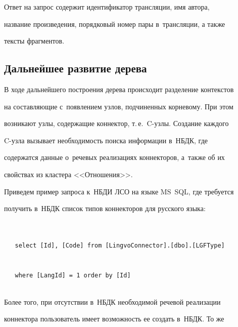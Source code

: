    


  


  Ответ на запрос содержит идентификатор трансляции, имя автора, 


название произведения, порядковый номер пары в~трансляции, а также 


тексты фрагментов.


  


  \subsection{Дальнейшее развитие дерева}


  


  В ходе дальнейшего построения дерева происходит разделение контекстов 


на составляющие с~появлением узлов, подчиненных корневому. При этом 


возникают узлы, содержащие коннектор, т.\,е.\ C-уз\-лы. Создание каж\-до\-го  


C-уз\-ла вызывает необходимость поиска информации в~НБДК, где 


содержатся данные о~речевых реализациях коннекторов, а~также об их 


свойствах из кластера <<Отношения>>.


  


  Приведем пример запроса к~НБДИ ЛСО на языке MS~SQL, где требуется 


получить в~НБДК список типов коннекторов для русского языка:





\noindent


{\small


  \begin{verbatim}


   select [Id], [Code] from [LingvoConnector].[dbo].[LGFType] 


   where [LangId] = 1 order by [Id]


  \end{verbatim}


  }


  


  


  Более того, при отсутствии в~НБДК необходимой речевой реализации 


коннектора пользователь имеет возможность ее создать в~НБДК. То же 


